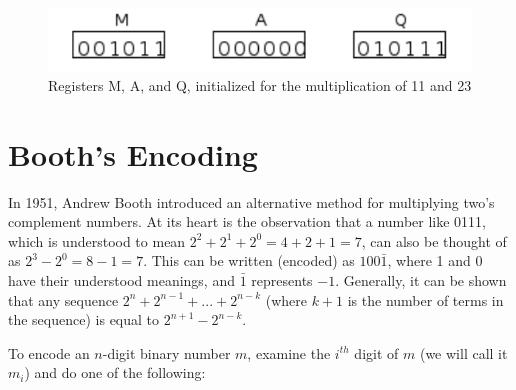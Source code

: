 \documentclass{article}
\begin{document}
\begin{figure}[h]
\centering
\includegraphics{init.pdf}
\caption{Registers M, A, and Q, initialized for the multiplication of 11 and 23}
\end{figure}

\section{Booth's Encoding}
In 1951, Andrew Booth introduced an alternative method for multiplying two's complement numbers.
At its heart is the observation that a number like 0111, which is understood to mean $2^2 + 2^1 + 2^0 = 4 + 2 + 1 = 7$, can also be thought of as $2^3 - 2^0 = 8 - 1 = 7$.
This can be written (encoded) as $100\bar{1}$, where 1 and 0 have their understood meanings, and $\bar{1}$ represents $-1$.
Generally, it can be shown that any sequence $2^n + 2^{n-1} + ...
+ 2^{n-k}$ (where $k+1$ is the number of terms in the sequence) is equal to $2^{n+1} - 2^{n-k}$.

To encode an $n$-digit binary number $m$, examine the $i^{th}$ digit of $m$ (we will call it $m_i$) and do one of the following: %
\end{document}
